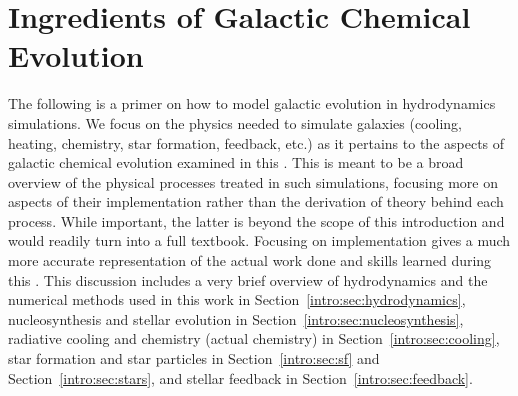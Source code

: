 \section{Ingredients of Galactic Chemical Evolution}
\label{intro:sec:ingredients}

The following is a primer on how to model galactic evolution in hydrodynamics simulations. We focus on the physics needed to simulate galaxies (cooling, heating, chemistry, star formation, feedback, etc.) as it pertains to the aspects of galactic chemical evolution examined in this \Dissertation. This is meant to be a broad overview of the physical processes treated in such simulations, focusing more on aspects of their implementation rather than the derivation of theory behind each process. While important, the latter is beyond the scope of this introduction and would readily turn into a full textbook. Focusing on implementation gives a much more accurate representation of the actual work done and skills learned during this \Dissertation. This discussion includes a very brief overview of hydrodynamics and the numerical methods used in this work in Section~\ref{intro:sec:hydrodynamics}, nucleosynthesis and stellar evolution in Section~\ref{intro:sec:nucleosynthesis}, radiative cooling and chemistry (actual chemistry) in Section~\ref{intro:sec:cooling}, star formation and star particles in Section~\ref{intro:sec:sf} and Section~\ref{intro:sec:stars}, and stellar feedback in Section~\ref{intro:sec:feedback}.

